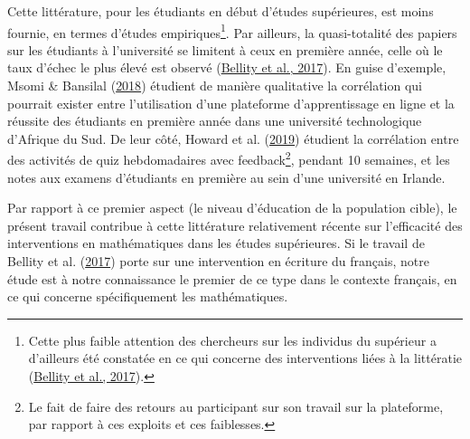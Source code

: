 \documentclass[
]{book}
\begin{document}
Cette littérature, pour les étudiants en début d'études supérieures, est moins fournie, en termes d'études empiriques\footnote{Cette plus faible attention des chercheurs sur les individus du supérieur a d'ailleurs été constatée en ce qui concerne des interventions liées à la littératie (\protect\hyperlink{ref-BEL:eal:17}{Bellity et al., 2017}).}. Par ailleurs, la quasi-totalité des papiers sur les étudiants à l'université se limitent à ceux en première année, celle où le taux d'échec le plus élevé est observé (\protect\hyperlink{ref-BEL:eal:17}{Bellity et al., 2017}). En guise d'exemple, Msomi \& Bansilal (\protect\hyperlink{ref-MSO:BAN:18}{2018}) étudient de manière qualitative la corrélation qui pourrait exister entre l'utilisation d'une plateforme d'apprentissage en ligne et la réussite des étudiants en première année dans une université technologique d'Afrique du Sud. De leur côté, Howard et al. (\protect\hyperlink{ref-HOW:eal:19}{2019}) étudient la corrélation entre des activités de quiz hebdomadaires avec feedback\footnote{Le fait de faire des retours au participant sur son travail sur la plateforme, par rapport à ces exploits et ces faiblesses.}, pendant 10 semaines, et les notes aux examens d'étudiants en première au sein d'une université en Irlande.

Par rapport à ce premier aspect (le niveau d'éducation de la population cible), le présent travail contribue à cette littérature relativement récente sur l'efficacité des interventions en mathématiques dans les études supérieures. Si le travail de Bellity et al. (\protect\hyperlink{ref-BEL:eal:17}{2017}) porte sur une intervention en écriture du français, notre étude est à notre connaissance le premier de ce type dans le contexte français, en ce qui concerne spécifiquement les mathématiques.
\end{document}
